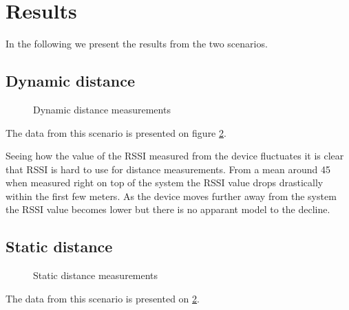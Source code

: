 \section{Results}
\label{sec_results}

In the following we present the results from the two scenarios.

\subsection{Dynamic distance}
%
%
%
%
%

\begin{figure}		
	
	
	
	\caption{ Dynamic distance measurements }
	\label{graf_InsideMesurements}
	
\end{figure}


The data from this scenario is presented on figure \cref{graf_InsideMesurements}.

Seeing how the value of the RSSI measured from the device fluctuates it is clear that RSSI is hard to use for distance measurements. From a mean around 45 when measured right on top of the system the RSSI value drops drastically within the first few meters. As the device moves further away from the system the RSSI value becomes lower but there is no apparant model to the decline.

\subsection{Static distance}


\begin{figure}
	
	
	\caption{Static distance measurements}
	\label{graf_InsideMesurements}
\end{figure}


The data from this scenario is presented on \cref{graf_InsideMesurements}. 



